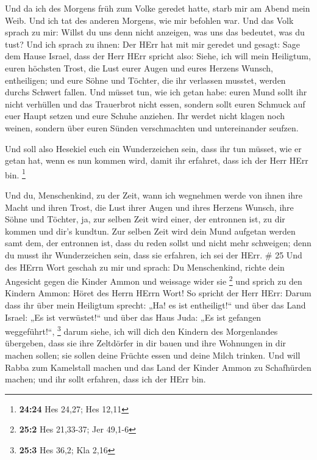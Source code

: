  Und da ich des Morgens früh zum Volke geredet hatte, starb
mir am Abend mein Weib. Und ich tat des anderen Morgens, wie mir
befohlen war.  Und das Volk sprach zu mir: Willst du uns
denn nicht anzeigen, was uns das bedeutet, was du tust? 
Und ich sprach zu ihnen: Der HErr hat mit mir geredet und gesagt:
 Sage dem Hause Israel, dass der Herr HErr spricht also:
Siehe, ich will mein Heiligtum, euren höchsten Trost, die Lust eurer
Augen und eures Herzens Wunsch, entheiligen; und eure Söhne und Töchter,
die ihr verlassen musstet, werden durchs Schwert fallen. 
Und müsset tun, wie ich getan habe: euren Mund sollt ihr nicht verhüllen
und das Trauerbrot nicht essen,  sondern sollt euren
Schmuck auf euer Haupt setzen und eure Schuhe anziehen. Ihr werdet nicht
klagen noch weinen, sondern über euren Sünden verschmachten und
untereinander seufzen.

 Und soll also Hesekiel euch ein Wunderzeichen sein, dass
ihr tun müsset, wie er getan hat, wenn es nun kommen wird, damit ihr
erfahret, dass ich der Herr HErr bin. \footnote{\textbf{24:24} Hes
  24,27; Hes 12,11}

 Und du, Menschenkind, zu der Zeit, wann ich wegnehmen
werde von ihnen ihre Macht und ihren Trost, die Lust ihrer Augen und
ihres Herzens Wunsch, ihre Söhne und Töchter,  ja, zur
selben Zeit wird einer, der entronnen ist, zu dir kommen und dir's
kundtun.  Zur selben Zeit wird dein Mund aufgetan werden
samt dem, der entronnen ist, dass du reden sollst und nicht mehr
schweigen; denn du musst ihr Wunderzeichen sein, dass sie erfahren, ich
sei der HErr. \# 25  Und des HErrn Wort geschah zu mir und
sprach:  Du Menschenkind, richte dein Angesicht gegen die
Kinder Ammon und weissage wider sie \footnote{\textbf{25:2} Hes
  21,33-37; Jer 49,1-6}  und sprich zu den Kindern Ammon:
Höret des Herrn HErrn Wort! So spricht der Herr HErr: Darum dass ihr
über mein Heiligtum sprecht: „Ha! es ist entheiligt!{}`` und über das
Land Israel: „Es ist verwüstet!{}`` und über das Haus Juda: „Es ist
gefangen weggeführt!{}``, \footnote{\textbf{25:3} Hes 36,2; Kla 2,16}
 darum siehe, ich will dich den Kindern des Morgenlandes
übergeben, dass sie ihre Zeltdörfer in dir bauen und ihre Wohnungen in
dir machen sollen; sie sollen deine Früchte essen und deine Milch
trinken.  Und will Rabba zum Kamelstall machen und das Land
der Kinder Ammon zu Schafhürden machen; und ihr sollt erfahren, dass ich
der HErr bin.

